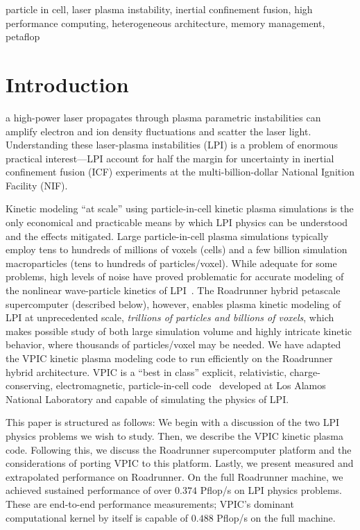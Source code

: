 \documentclass[journal,twoside]{IEEEtran}
\begin{document}
\begin{IEEEkeywords}
particle in cell,
laser plasma instability,
inertial confinement fusion,
high performance computing,
heterogeneous architecture,
memory management,
petaflop
\end{IEEEkeywords}

\section{Introduction}

 a high-power laser propagates through plasma
parametric instabilities can amplify electron and ion density
fluctuations and scatter the laser light.  Understanding these
laser-plasma instabilities (LPI) is a problem of enormous practical
interest---LPI account for half the margin for uncertainty in inertial
confinement fusion (ICF) experiments at the multi-billion-dollar
National Ignition Facility (NIF).

Kinetic modeling ``at scale'' using particle-in-cell kinetic plasma
simulations is the only economical and practicable means by which LPI
physics can be understood and the effects mitigated.  Large
particle-in-cell plasma simulations typically employ tens to hundreds
of millions of voxels (cells) and a few billion simulation
macroparticles (tens to hundreds of particles/voxel).  While adequate
for some problems, high levels of noise have proved problematic for
accurate modeling of the nonlinear wave-particle kinetics of
LPI~\cite{Yin_et_al_Phys_Plasmas_2006}.  The Roadrunner hybrid
petascale supercomputer (described below), however, enables plasma
kinetic modeling of LPI at unprecedented scale,
\textit{trillions of particles and billions of voxels}, which makes 
possible study of both large simulation volume and highly intricate
kinetic behavior, where thousands of particles/voxel may be needed.
We have adapted the VPIC kinetic plasma modeling code to run
efficiently on the Roadrunner hybrid architecture.  VPIC is a ``best
in class'' explicit, relativistic, charge-conserving, electromagnetic,
particle-in-cell code~\cite{Bowers_et_al_Phys_Plasmas_2007} developed
at Los Alamos National Laboratory and capable of simulating the
physics of LPI.

This paper is structured as follows: We begin with a discussion of the
two LPI physics problems we wish to study.  Then, we describe the VPIC
kinetic plasma code.  Following this, we discuss the Roadrunner
supercomputer platform and the considerations of porting VPIC to this
platform.  Lastly, we present measured and extrapolated performance on
Roadrunner.  On the full Roadrunner machine, we achieved sustained
performance of over $0.374$ Pflop/s on LPI physics problems.  These
are end-to-end performance measurements; VPIC's dominant computational
kernel by itself is capable of $0.488$ Pflop/s on the full machine.
\end{document}
